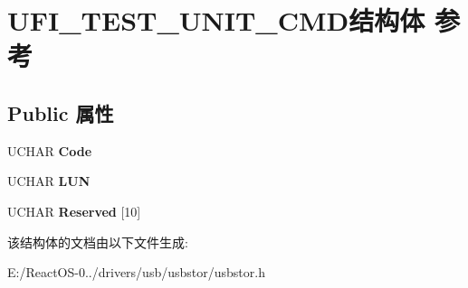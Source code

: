 \hypertarget{struct_u_f_i___t_e_s_t___u_n_i_t___c_m_d}{}\section{U\+F\+I\+\_\+\+T\+E\+S\+T\+\_\+\+U\+N\+I\+T\+\_\+\+C\+M\+D结构体 参考}
\label{struct_u_f_i___t_e_s_t___u_n_i_t___c_m_d}
\subsection*{Public 属性}
\begin{DoxyCompactItemize}
\item 
\mbox{\label{struct_u_f_i___t_e_s_t___u_n_i_t___c_m_d_ac75321b8a4ba606e88e698b2842a6551}} 
U\+C\+H\+AR {\bfseries Code}
\item 
\mbox{\label{struct_u_f_i___t_e_s_t___u_n_i_t___c_m_d_a3637d2bc0eb19c848de17c109ed0300e}} 
U\+C\+H\+AR {\bfseries L\+UN}
\item 
\mbox{\label{struct_u_f_i___t_e_s_t___u_n_i_t___c_m_d_ada221ef45a650f73c74ecff6b93569cc}} 
U\+C\+H\+AR {\bfseries Reserved} \mbox{[}10\mbox{]}
\end{DoxyCompactItemize}


该结构体的文档由以下文件生成\+:\begin{DoxyCompactItemize}
\item 
E\+:/\+React\+O\+S-\/0../drivers/usb/usbstor/usbstor.\+h\end{DoxyCompactItemize}
